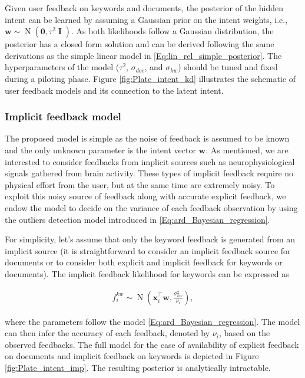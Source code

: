 \documentclass[dissertation,math,vertlayout,pdfa,colorlinks]{aaltoseries}
\newcommand{\bw}{\bm{w}}
\DeclareMathOperator{\eye}{\textbf{I}}
\DeclareMathOperator{\normalpdf}{N}
\newcommand{\tp}{^{\top}}
\begin{document}
Given user feedback on keywords and documents, the posterior of the hidden intent can be learned by assuming a Gaussian prior on the intent weights, i.e., $\bw \sim \normalpdf(\bm{0},\tau^2 \eye)$. As both likelihoods follow a Gaussian distribution, the posterior has a closed form solution and can be derived following the same derivations as the simple linear model in \ref{Eq:lin_rel_simple_posterior}. The hyperparameters of the model ($\tau^2$, $\sigma_{doc}$, and $\sigma_{kw}$) should be tuned and fixed during a piloting phase. Figure \ref{fig:Plate_intent_kd} illustrates the schematic of user feedback models and its connection to the latent intent. 


\subsubsection{Implicit feedback model}

The proposed model is simple as the noise of feedback is assumed to be known and the only unknown parameter is the intent vector $\bw$. As mentioned, we are interested to consider feedbacks from implicit sources such as neurophysiological signals gathered from brain activity. %
These types of implicit feedback require no physical effort from the user, but at the same time are extremely noisy. To exploit this noisy source of feedback along with accurate explicit feedback, we endow the model to decide on the variance of each feedback observation by using the outliers detection model introduced in \ref{Eq:ard_Bayesian_regression}. %

For simplicity, let's assume that only the keyword feedback is generated from an implicit source (it is straightforward to consider an implicit feedback source for documents or to consider both explicit and implicit feedback for keywords or documents). The implicit feedback likelihood for keywords can be expressed as 

\begin{align}\label{Eq:imp_fb_on_kw} 
f_{i}^{kw} \sim \normalpdf(\bm{x}_i\tp\bw,\frac{\sigma_{kw}^2}{\nu_i}),
\end{align}  

\noindent where the parameters follow the model \ref{Eq:ard_Bayesian_regression}. The model can then infer the accuracy of each feedback, denoted by $\nu_i$, based on the observed feedbacks. The full model for the case of availability of explicit feedback on documents and implicit feedback on keywords is depicted in Figure \ref{fig:Plate_intent_imp}. The resulting posterior is analytically intractable.  
\end{document}
